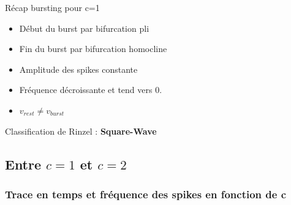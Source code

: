 \documentclass[xcolor={dvipsnames},10pt]{beamer}
\begin{document}
\begin{frame}{Récap bursting pour c=1}
\begin{center}
\begin{itemize}
\item Début du burst par bifurcation pli
\item<2,3,4,5> Fin du burst par bifurcation homocline
\item<3,4,5> Amplitude des spikes constante
\item<4,5> Fréquence décroissante et tend vers 0.
\item<5> $v_{rest} \ne v_{burst}$
\end{itemize}
\vspace{1cm}
Classification de Rinzel : \textbf{Square-Wave}
\end{center}
\end{frame}

\subsection{Entre \texorpdfstring{$c = 1$}{Lg} et \texorpdfstring{$c = 2$}{Lg}}

\subsubsection*{Trace en temps et fréquence des spikes en fonction de c}
\end{document}
